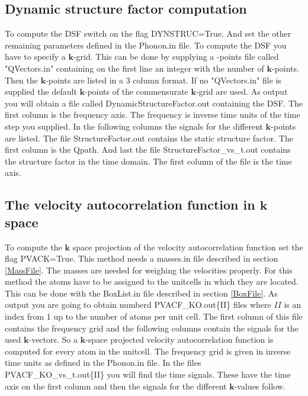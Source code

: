 \documentclass[a4paper,12pt]{article}
\begin{document}
\subsection{Dynamic structure factor computation}
To compute the DSF switch on the flag DYNSTRUC=True. And set the other remaining parameters
defined in the Phonon.in file. To compute the DSF you have to specify a $\mathbf{k}$-grid.
This can be done by supplying a -points file called "QVectors.in" containing on the first line
an integer with the number of $\mathbf{k}$-points. Then the $\mathbf{k}$-points are listed in
a 3 column format. If no "QVectors.in" file is supplied the default $\mathbf{k}$-points
of the commensurate $\mathbf{k}$-grid are used. As output you will obtain a file called
DynamicStructureFactor.out containing the DSF. The first column is the frequency axis. 
The frequency is inverse time units of the time step you supplied.
In the following columns the signals for the different $\mathbf{k}$-points are listed.
The file StructureFactor.out contains the static structure factor. The first column is
the Qpath. And last the file StructureFactor\_vs\_t.out contains the structure factor in the
time domain. The first column of the file is the time axis.




\subsection{The velocity autocorrelation function in $\mathbf{k}$ space}
To compute the $\mathbf{k}$ space projection of the velocity autocorrelation function
set the flag PVACK=True. This method needs a masses.in file described
in section \ref{MassFile}. The masses are needed for weighing the velocities properly.
For this method the atoms have to be assigned to the unitcells
in which they are located. This can be done with the BoxList.in file described in
section \ref{BoxFile}. As output you are going to obtain numberd PVACF\_KO.out\{II\}
files where $II$ is an index from 1 up to the number of atoms per unit cell.
The first column of this file contains the frequency grid and the following columns
contain the signals for the used $\mathbf{k}$-vectors.
So a $\mathbf{k}$-space projected velocity autocorrelation function is computed for
every atom in the unitcell. The frequency grid is given in inverse time units as
defined in the Phonon.in file. In the files PVACF\_KO\_vs\_t.out\{II\} you will find
the time signals. These have the time axis on the first column and then
the signals for the different $\mathbf{k}$-values follow.
\end{document}
